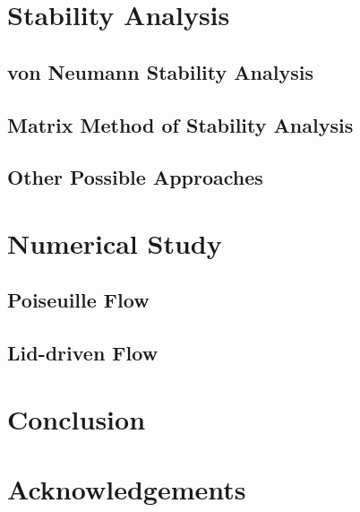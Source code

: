 \documentclass{article}
\begin{document}
\section{Stability Analysis}

\subsection{von Neumann Stability Analysis}

\subsection{Matrix Method of Stability Analysis}

\subsection{Other Possible Approaches}

\section{Numerical Study}

\subsection{Poiseuille Flow}

\subsection{Lid-driven Flow}

\section{Conclusion}

\section*{Acknowledgements}



	
\end{document}
